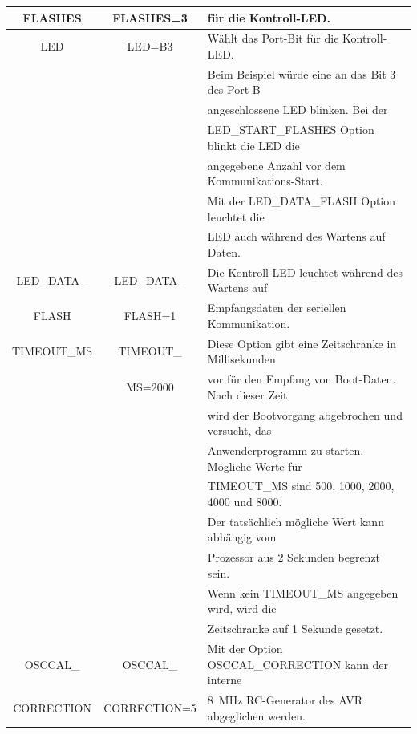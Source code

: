 \begin{table}[H]
\begin{center}
\begin{tabular}{| c | c | l |}
   FLASHES         &   FLASHES=3    & für die Kontroll-LED.                            \\
    \hline
 LED               & LED=B3         & Wählt das Port-Bit für die  Kontroll-LED. \\
                   &                & Beim Beispiel würde eine an das Bit 3 des Port B \\ 
                   &                & angeschlossene LED blinken. Bei der \\
                   &                & LED\_START\_FLASHES  Option  blinkt die LED die\\
                   &                & angegebene Anzahl vor dem Kommunikations-Start. \\
                   &                & Mit der LED\_DATA\_FLASH Option leuchtet die \\
                   &                & LED auch während des Wartens auf Daten. \\
    \hline
 LED\_DATA\_       & LED\_DATA\_    & Die Kontroll-LED leuchtet während des Wartens auf \\
      FLASH        &    FLASH=1     & Empfangsdaten der seriellen Kommunikation.\\
    \hline
 TIMEOUT\_MS       & TIMEOUT\_      & Diese Option gibt eine Zeitschranke in Millisekunden \\
                   &  MS=2000       & vor für den Empfang von Boot-Daten. Nach dieser Zeit\\
                   &                & wird der Bootvorgang abgebrochen und versucht, das \\
                   &                & Anwenderprogramm zu starten. Mögliche Werte für \\
                   &                & TIMEOUT\_MS sind 500, 1000, 2000, 4000 und 8000. \\
                   &                & Der tatsächlich mögliche Wert kann abhängig vom \\
                   &                & Prozessor aus 2 Sekunden begrenzt sein. \\
                   &                & Wenn kein TIMEOUT\_MS angegeben wird, wird die \\
                   &                & Zeitschranke auf 1 Sekunde gesetzt. \\
    \hline
 OSCCAL\_          & OSCCAL\_       & Mit der Option OSCCAL\_CORRECTION kann der interne \\
 CORRECTION        & CORRECTION=5   & 8~MHz RC-Generator des AVR abgeglichen werden. \\

\end{tabular}
\end{center}
\end{table}
